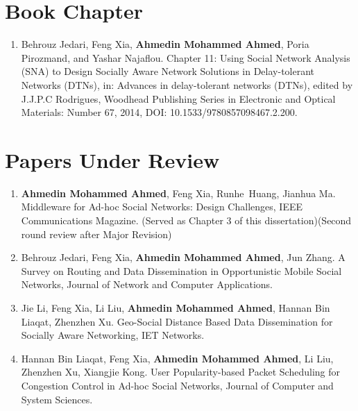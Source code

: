 \section*{Book Chapter}
\begin{enumerate}
\item
Behrouz Jedari, Feng Xia, \textbf{Ahmedin Mohammed Ahmed}, Poria Pirozmand, and Yashar Najaflou. Chapter 11: Using Social Network Analysis (SNA) to Design Socially Aware Network Solutions in Delay-tolerant Networks (DTNs), in: Advances in delay-tolerant networks (DTNs), edited by J.J.P.C Rodrigues, Woodhead Publishing Series in Electronic and Optical Materials: Number 67, 2014, DOI: 10.1533/9780857098467.2.200.
\end{enumerate}

\section*{Papers Under Review}
\begin{enumerate}

\item
\textbf{Ahmedin Mohammed Ahmed}, Feng Xia, Runhe~Huang, Jianhua Ma. Middleware for Ad-hoc Social Networks: Design Challenges, IEEE Communications Magazine. (Served as Chapter 3 of this dissertation)(Second round review after Major Revision)


\item
Behrouz Jedari, Feng Xia, \textbf{Ahmedin Mohammed Ahmed}, Jun Zhang. A Survey on Routing and Data Dissemination in Opportunistic Mobile Social Networks, Journal of Network and Computer Applications.


\item
Jie Li, Feng Xia, Li Liu, \textbf{Ahmedin Mohammed Ahmed}, Hannan Bin Liaqat, Zhenzhen Xu. Geo-Social Distance Based Data Dissemination for Socially Aware Networking, IET Networks.

\item
Hannan Bin Liaqat, Feng Xia, \textbf{Ahmedin Mohammed Ahmed}, Li Liu, Zhenzhen Xu, Xiangjie Kong. User Popularity-based Packet Scheduling for Congestion Control in Ad-hoc Social Networks, Journal of Computer and System Sciences.

\end{enumerate}



